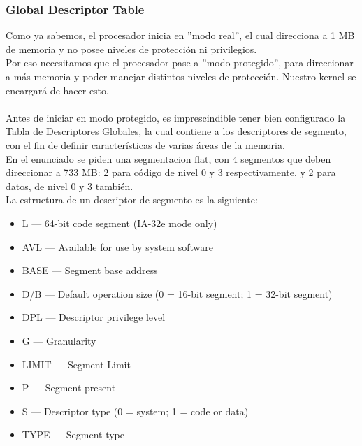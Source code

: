 \subsubsection{Global Descriptor Table}
Como ya sabemos, el procesador inicia en ''modo real'', el cual direcciona a 1 MB de memoria y no posee niveles de protecci\'on ni privilegios.\\
Por eso necesitamos que el procesador pase a ''modo protegido'', para direccionar a m\'as memoria y poder manejar distintos niveles de protecci\'on. Nuestro kernel se encargar\'a de hacer esto.\\
\\
Antes de iniciar en modo protegido, es imprescindible tener bien configurado la Tabla de Descriptores Globales, la cual contiene a los descriptores de segmento, con el fin de definir caracter\'isticas de varias \'areas de la memoria.\\
En el enunciado se piden una segmentacion flat, con 4 segmentos que deben direccionar a 733 MB: 2 para c\'odigo de nivel 0 y 3 respectivamente, y 2 para datos, de nivel 0 y 3 tambi\'en.\\

La estructura de un descriptor de segmento es la siguiente:\\
\begin{itemize}
  \item L — 64-bit code segment (IA-32e mode only)
  \item AVL — Available for use by system software
  \item BASE — Segment base address
  \item D/B — Default operation size (0 = 16-bit segment; 1 = 32-bit segment)
  \item DPL — Descriptor privilege level
  \item G — Granularity
  \item LIMIT — Segment Limit
  \item P — Segment present
  \item S — Descriptor type (0 = system; 1 = code or data)
  \item TYPE — Segment type
\end{itemize}

